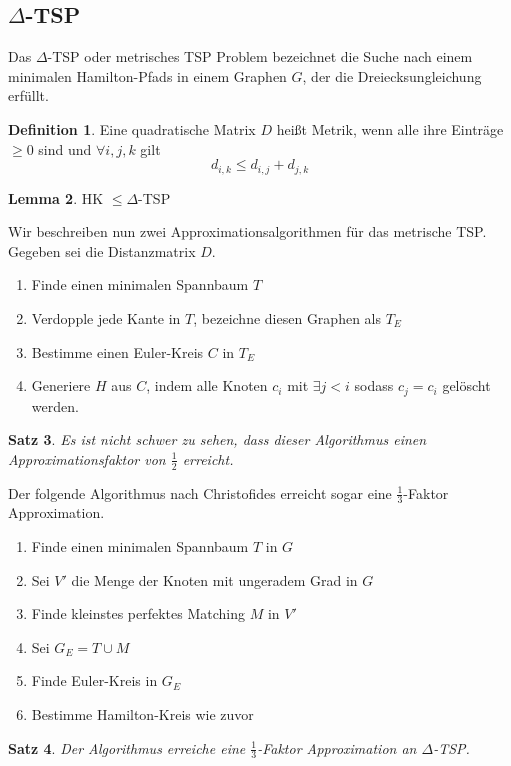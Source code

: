 \documentclass[a4paper, 12pt]{article}
\theoremstyle{plain}
\newtheorem{theorem}{Satz}[section] %
\theoremstyle{definition}
\newtheorem{definition}[theorem]{Definition} %
\theoremstyle{lemma}
\newtheorem{lemma}[theorem]{Lemma}
\theoremstyle{remark}
\theoremstyle{corollary}
\theoremstyle{example}
\begin{document}
\subsection{$\Delta$-TSP}
	Das $\Delta$-TSP oder metrisches TSP Problem bezeichnet die Suche nach einem minimalen Hamilton-Pfads in einem Graphen $G$, der die Dreiecksungleichung erfüllt.
	\begin{definition}
		Eine quadratische Matrix $D$ heißt Metrik, wenn alle ihre Einträge $\geq 0$ sind und $\forall i,j,k$ gilt \[d_{i,k} \leq d_{i,j} + d_{j,k}\]
	\end{definition}
	\begin{lemma}
		HK $\leq \Delta$-TSP
	\end{lemma}
	Wir beschreiben nun zwei Approximationsalgorithmen für das metrische TSP.\\
	Gegeben sei die Distanzmatrix $D$.
	\begin{enumerate}
		\item Finde einen minimalen Spannbaum $T$
		\item Verdopple jede Kante in $T$, bezeichne diesen Graphen als $T_E$
		\item Bestimme einen Euler-Kreis $C$ in $T_E$
		\item Generiere $H$ aus $C$, indem alle Knoten $c_i$ mit $\exists j<i$ sodass $c_j=c_i$ gelöscht werden.
	\end{enumerate}
	\begin{theorem}
		Es ist nicht schwer zu sehen, dass dieser Algorithmus einen Approximationsfaktor von $\frac{1}{2}$ erreicht.
	\end{theorem}
	Der folgende Algorithmus nach Christofides erreicht sogar eine $\frac{1}{3}$-Faktor Approximation.
	\begin{enumerate}
		\item Finde einen minimalen Spannbaum $T$ in $G$
		\item Sei $V'$ die Menge der Knoten mit ungeradem Grad in $G$
		\item Finde kleinstes perfektes Matching $M$ in $V'$
		\item Sei $G_E = T\cup M$
		\item Finde Euler-Kreis in $G_E$
		\item Bestimme Hamilton-Kreis wie zuvor
	\end{enumerate}
	\begin{theorem}
		Der Algorithmus erreiche eine $\frac{1}{3}$-Faktor Approximation an $\Delta$-TSP.
	\end{theorem}
\end{document}
